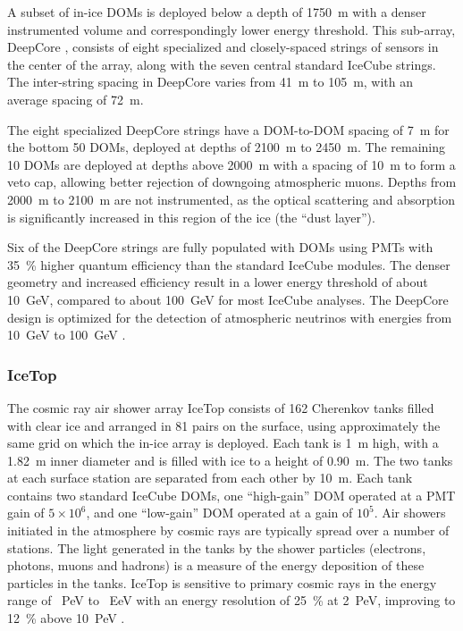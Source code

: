 A subset of in-ice DOMs is deployed below a
depth of \SI{1750}{\meter} with a denser instrumented volume and
correspondingly lower energy threshold. This
sub-array, DeepCore \cite{ICECUBE:DC}, consists of eight specialized and
closely-spaced strings of sensors in the center of the array, along with
the seven central standard IceCube strings. The inter-string spacing
in DeepCore varies from \SI{41}{\meter} to \SI{105}{\meter}, with an
average spacing of \SI{72}{\meter}.

The eight specialized DeepCore strings have a DOM-to-DOM spacing of
\SI{7}{\meter} for the bottom 50 DOMs, deployed at depths of
\SI{2100}{\meter} to \SI{2450}{\meter}.  The remaining 10 DOMs are
deployed at depths above \SI{2000}{\meter} with a spacing of
\SI{10}{\meter} to form a veto cap, allowing better rejection of downgoing
atmospheric muons.  Depths from \SI{2000}{\meter} to \SI{2100}{\meter}
are not instrumented, as the optical scattering and absorption is
significantly increased in this region of the ice (the ``dust layer'').

Six of the DeepCore strings are fully populated with
DOMs using PMTs with \SI{35}{\%} higher quantum efficiency than the
standard IceCube modules.  The denser geometry and increased efficiency
result in a lower energy threshold of about
\SI{10}{\giga\electronvolt}, compared to about
\SI{100}{\giga\electronvolt} for most IceCube analyses. The DeepCore design
is optimized for the detection of atmospheric neutrinos with energies
from \SI{10}{\giga\electronvolt} to \SI{100}{\giga\electronvolt}
\cite{ICECUBE:DC}. 

\subsubsection{IceTop}

The cosmic ray air shower array IceTop \cite{ICECUBE:IceTop} consists
of \num{162} Cherenkov tanks filled with clear ice and arranged in
\num{81} pairs on the
surface, using approximately the same grid on which the in-ice
array is deployed. Each tank is \SI{1}{\meter} high, with a \SI{1.82}{\meter} inner diameter and is
filled with ice to a height of \SI{0.90}{\meter}.  The two tanks at each surface station are separated from
each other by \SI{10}{\meter}. Each tank contains two standard IceCube
DOMs, one ``high-gain'' DOM operated at a PMT gain of $5 \times 10^{6}$, and one
``low-gain'' DOM operated at a gain of $10^{5}$. Air showers initiated in the atmosphere by cosmic rays are typically
spread over a number of stations. The light generated in the tanks by the
shower particles (electrons, photons, muons and hadrons) is a measure of
the energy deposition of these particles in the tanks. IceTop is sensitive to
primary cosmic rays in the energy range of \SI{}{PeV} to \SI{}{EeV}
with an energy resolution of \SI{25}{\%} at \SI{2}{PeV}, improving to
\SI{12}{\%} above \SI{10}{PeV} \cite{IT:measurement}.




